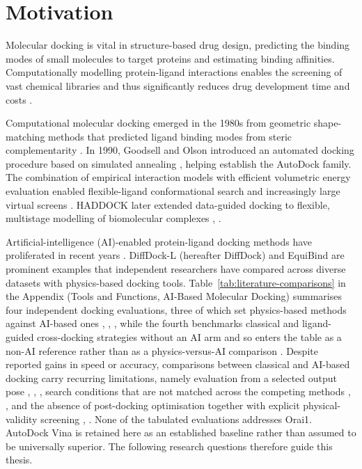 \hypertarget{motivation}{%
\chapter{\texorpdfstring{Motivation }{Motivation }}\label{motivation}}

Molecular docking is vital in structure-based drug design, predicting the binding modes of small molecules to target proteins and estimating binding affinities. Computationally modelling protein-ligand interactions enables the screening of vast chemical libraries and thus significantly reduces drug development time and costs \cite{ref007}.

Computational molecular docking emerged in the 1980s from geometric shape-matching methods that predicted ligand binding modes from steric complementarity \cite{ref001}. In 1990, Goodsell and Olson introduced an automated docking procedure based on simulated annealing \cite{ref002}, helping establish the AutoDock family. The combination of empirical interaction models with efficient volumetric energy evaluation enabled flexible-ligand conformational search and increasingly large virtual screens \cite{ref003}. HADDOCK later extended data-guided docking to flexible, multistage modelling of biomolecular complexes \cite{ref004}, \cite{ref005}.

Artificial-intelligence (AI)-enabled protein-ligand docking methods have proliferated in recent years \cite{ref006}. DiffDock-L (hereafter DiffDock) and EquiBind are prominent examples that independent researchers have compared across diverse datasets with physics-based docking tools. Table~\ref{tab:literature-comparisons} in the Appendix (Tools and Functions, AI-Based Molecular Docking) summarises four independent docking evaluations, three of which set physics-based methods against AI-based ones \cite{ref012}, \cite{ref013}, \cite{ref032}, while the fourth benchmarks classical and ligand-guided cross-docking strategies without an AI arm and so enters the table as a non-AI reference rather than as a physics-versus-AI comparison \cite{ref033}. Despite reported gains in speed or accuracy, comparisons between classical and AI-based docking carry recurring limitations, namely evaluation from a selected output pose \cite{ref012}, \cite{ref013}, \cite{ref035}, search conditions that are not matched across the competing methods \cite{ref011}, \cite{ref035}, and the absence of post-docking optimisation together with explicit physical-validity screening \cite{ref012}, \cite{ref035}. None of the tabulated evaluations addresses Orai1. AutoDock Vina is retained here as an established baseline rather than assumed to be universally superior. The following research questions therefore guide this thesis.

